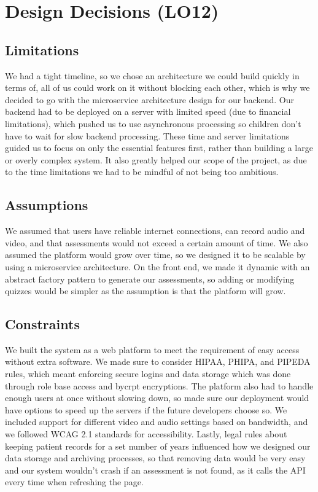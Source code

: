 \documentclass{article}
\begin{document}
\section{Design Decisions (LO12)}

\subsection{Limitations}
We had a tight timeline, so we chose an architecture we could build quickly in terms of, all of us could work 
on it without blocking each other, which is why we decided to go with the microservice architecture design for our backend.
Our backend had to be deployed on a server with limited speed (due to financial limitations), which pushed us to use asynchronous processing 
so children don't have to wait for slow backend processing. These time and server limitations guided us to focus on only 
the essential features first, rather than building a large or overly complex system. It also greatly helped our scope of the project, as due to the time limitations
we had to be mindful of not being too ambitious.

\subsection{Assumptions}
We assumed that users have reliable internet connections, can record audio and video, and that assessments would 
not exceed a certain amount of time. We also assumed the platform would grow over time, so we designed it to be 
scalable by using a microservice architecture. On the front end, we made it dynamic with an abstract 
factory pattern to generate our assessments, so adding or modifying quizzes would be simpler as the assumption is that the platform will grow. 

\subsection{Constraints}
We built the system as a web platform to meet the requirement of easy access without extra software. We made sure 
to consider HIPAA, PHIPA, and PIPEDA rules, which meant enforcing secure logins and data storage which was done through role base access and bycrpt encryptions. 
The platform also had to handle enough users at once without slowing down, so made sure our deployment would have options to speed up the servers if the 
future developers choose so. We included support for different video and audio settings based on bandwidth, and we followed 
WCAG 2.1 standards for accessibility. Lastly, legal rules about keeping patient records for a set number of years 
influenced how we designed our data storage and archiving processes, so that removing data would be very easy and our system wouldn't crash if an assessment is not found, as it calls the API every time when refreshing the page. 
\end{document}
